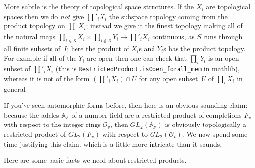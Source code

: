 More subtle is the theory of topological space structures. If the $X_i$
are topological spaces then we do \emph{not} give $\prod'_iX_i$ the subspace
topology coming from the product topology on $\prod_iX_i$; instead we give
it the finest topology making all of the
natural maps $\prod_{i\in S}X_i\times\prod_{i\notin S}Y_i\to \prod'_iX_i$ continuous,
as $S$ runs through all finite subsets of~$I$; here the product of $X_i$s and $Y_i$s
has the product topology. For example if all of the $Y_i$ are open
then one can check that $\prod_iY_i$ is an open subset of
$\prod'_iX_i$ (this is {\tt RestrictedProduct.isOpen\_forall\_mem} in mathlib),
whereas it is not of the form $\left(\prod'_iX_i\right)\cap U$ for any open subset~$U$
of $\prod_iX_i$ in general.

If you've seen automorphic forms before, then here is an obvious-sounding claim:
because the adeles $\mathbb{A}_F$ of a number field are a restricted product of
completions $F_v$ with respect to the integer rings $\mathcal{O}_v$, then
$GL_2(\mathbb{A}_F)$ is obviously topologically a restricted product of
$GL_2(F_v)$ with respect to $GL_2(\mathcal{O}_v)$. We now spend some time justifying
this claim, which is a little more intricate than it sounds.

Here are some basic facts we need about restricted products.

